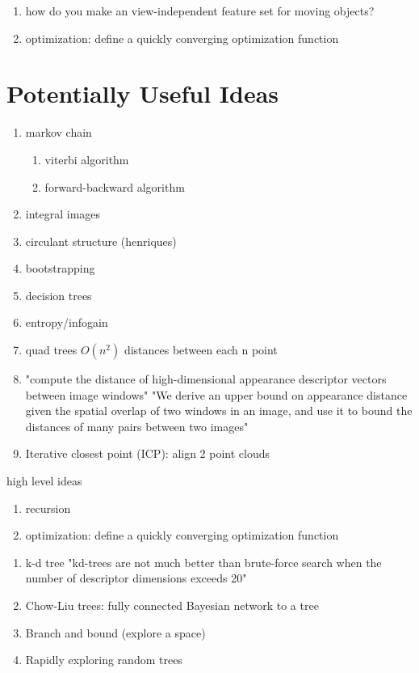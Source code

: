 \begin{enumerate}
\item how do you make an view-independent feature set for moving objects?
\item optimization: define a quickly converging optimization function
\end{enumerate}


\section{Potentially Useful Ideas}
\begin{enumerate}
	\item markov chain
	\begin{enumerate}
		\item viterbi algorithm
		\item forward-backward algorithm
	\end{enumerate}
	\item integral images
	\item circulant structure (henriques)
	\item bootstrapping
	\item decision trees
	\item entropy/infogain
	\item quad trees $O(n^2)$ distances between each n point
	\item "compute the distance of high-dimensional appearance descriptor vectors between image windows" "We derive an upper bound on appearance distance given the spatial overlap of two windows in an image, and use it to bound the distances of many pairs between two images" \cite{alexe2011exploiting}
	\item Iterative closest point (ICP): align 2 point clouds

\end{enumerate}

high level ideas
\begin{enumerate}
\item recursion
\item optimization: define a quickly converging optimization function
\end{enumerate}

\begin{enumerate}
\item k-d tree "kd-trees are not much better than brute-force search when the number of descriptor dimensions exceeds 20"
\item Chow-Liu trees: fully connected Bayesian network to a tree
\item Branch and bound (explore a space)
\item Rapidly exploring random trees
\end{enumerate}




